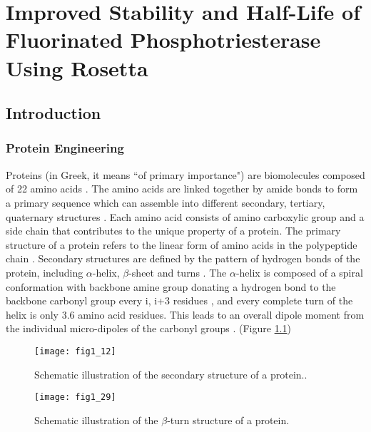 \chapter{Improved Stability and Half-Life of Fluorinated Phosphotriesterase
Using Rosetta} 
\label{chap:uaa}

\begin{refsection}

\section{Introduction}

\subsection{Protein Engineering}
\label{sec:protein-engineering}

Proteins (in Greek, it means “of primary importance") are biomolecules composed
of 22 amino acids \cite{Nelson2005}. The amino acids are linked together by
amide bonds to form a primary sequence which can assemble into different
secondary, tertiary, quaternary structures \cite{Berg2002a}. Each amino acid
consists of amino carboxylic group and a side chain that contributes to the
unique property of a protein. The primary structure of a protein refers to the
linear form of amino acids in the polypeptide chain \cite{Sanger1945}.
Secondary structures are defined by the pattern of hydrogen bonds of the
protein, including $\alpha$-helix, $\beta$-sheet and turns \cite{PAULING1951}.
The $\alpha$-helix is composed of a spiral conformation with backbone amine
group donating a hydrogen bond to the backbone carbonyl group every i, i+3
residues \cite{Kabsch1983}, and every complete turn of the helix is only 3.6
amino acid residues. This leads to an overall dipole moment from the individual
micro-dipoles of the carbonyl groups \cite{Hol1978}. (Figure
\ref{fig:alpha-helix-stabilization})

\begin{figure}[h!] \centering \texttt{[image: fig1\_12]}
    \caption[Schematic illustration of the secondary structure of a
    protein.]{Schematic illustration of the secondary structure of a
        protein.\cite{Berg2002a}.} 
    \label{fig:alpha-helix-stabilization}
\end{figure}
\begin{figure}[h!] \centering \texttt{[image: fig1\_29]}
    \caption[Schematic illustration of the $\beta$-turn structure of a
    protein.]{Schematic illustration of the $\beta$-turn structure of a
        protein\cite{Nemethy1972}.} 
    \label{fig:beta-turn}
\end{figure}


\end{refsection}
